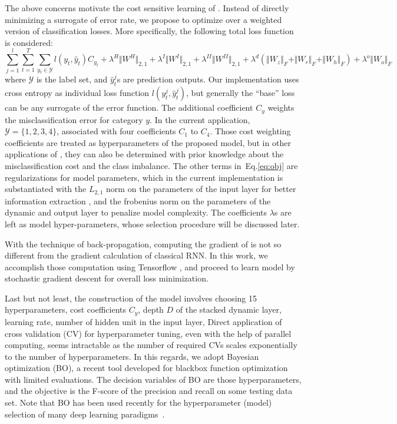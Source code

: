 The above concerns motivate the cost sensitive learning of \modelname.
Instead of directly minimizing a surrogate of error rate, we propose to optimize over a weighted version of classification losses.
More specifically, the following total loss function is considered:
\begin{equation}
\label{eq:obj}
\sum_{j=1}^l\sum_{t=1}^T \sum_{y_t \in \mathcal{Y}} l(y_t,\hat{y}_t)C_{y_t} + \lambda^H \Vert W^H\Vert_{2,1} + \lambda^I \Vert W^I\Vert_{2,1} + \lambda^{II} \Vert W^{II}\Vert_{2,1} + \lambda^d (\Vert W_z\Vert_{F}+\Vert W_r\Vert_F+\Vert W_h\Vert_F) +\lambda^o \Vert W_o\Vert_F
\end{equation}
where $\mathcal{Y}$ is the label set, and $\hat{y}_t^j$s are prediction outputs.
Our implementation uses cross entropy as individual loss function $l(y_t^j,\hat{y}_t^j)$, but generally the ``base'' loss can be any surrogate of the error function.
The additional coefficient $C_{y}$ weights the misclassification error for category $y$.
In the current application, $\mathcal{Y} = \{1,2,3,4\}$, associated with four coefficients $C_1$ to $C_4$.
Those cost weighting coefficients are treated as hyperparameters of the proposed model, but in other applications of \modelname, they can also be determined with prior knowledge about the misclassification cost and the class imbalance. The other terms in~Eq.\ref{eq:obj} are regularizations for model parameters, which in the current implementation is substantiated with the $L_{2,1}$ norm on the parameters of the input layer for better information extraction \cite{nie2010efficient}, and the frobenius norm on the parameters of the dynamic and output layer to penalize model complexity. The coefficients $\lambda$s are left as model hyper-parameters, whose selection procedure will be discussed later.

With the technique of back-propagation, computing the gradient of \modelname is not so different from the gradient calculation of classical RNN.
In this work, we accomplish those computation using Tensorflow \cite{bib:Tensorflow}, and proceed to learn \modelname model by stochastic gradient descent for overall loss minimization.

Last but not least, the construction of the \modelname model involves choosing 15 hyperparameters, \eg cost coefficients $C_{y}$, depth $D$ of the stacked dynamic layer, learning rate, number of hidden unit in the input layer, \etc
Direct application of cross validation (CV) for hyperparameter tuning, even with the help of parallel computing, seems intractable as the number of required CVs scales exponentially to the number of hyperparameters.
In this regards, we adopt Bayesian optimization (BO), a recent tool developed for blackbox function optimization with limited evaluations.
The decision variables of BO are those hyperparameters, and the objective is the F-score of the precision and recall on some testing data set.
Note that BO has been used recently for the hyperparameter (model) selection of many deep learning paradigms~\cite{snoek2012practical}.



